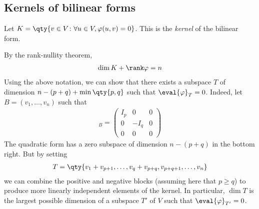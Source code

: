 \subsection{Kernels of bilinear forms}
\begin{definition}
	Let $K = \qty{ v \in V \colon \forall u \in V, \phi(u,v) = 0 }$.
	This is the \textit{kernel} of the bilinear form.
\end{definition}
\begin{remark}
	By the rank-nullity theorem,
	\begin{align*}
		\dim K + \rank \phi = n
	\end{align*}
	Using the above notation, we can show that there exists a subspace $T$ of dimension $n - (p+q) + \min\qty{p,q}$ such that $\eval{\phi}_T = 0$.
	Indeed, let $B = (v_1, \dots, v_n)$ such that
	\begin{align*}
		[\phi]_B = \begin{pmatrix}
			I_p & 0    & 0 \\
			0   & -I_q & 0 \\
			0   & 0    & 0
		\end{pmatrix}
	\end{align*}
	The quadratic form has a zero subspace of dimension $n - (p+q)$ in the bottom right.
	But by setting
	\begin{align*}
		T = \qty{v_1 + v_{p+1}, \dots, v_q + v_{p+q}, v_{p+q+1}, \dots, v_n}
	\end{align*}
	we can combine the positive and negative blocks (assuming here that $p \geq q$) to produce more linearly independent elements of the kernel.
	In particular, $\dim T$ is the largest possible dimension of a subspace $T'$ of $V$ such that $\eval{\phi}_{T'} = 0$.
\end{remark}

